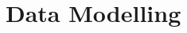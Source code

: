 \documentclass[models.tex]{subfiles}
\begin{document}
\section{Data Modelling} %
\label{sec:models}

\end{document}

